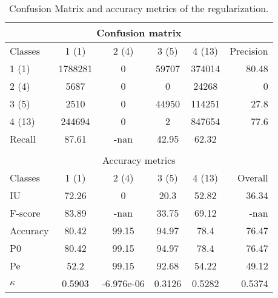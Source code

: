 \begin{table}
\begin{center}
\begin{tabular}{|l|c|c|c|c|r|}
\hline
\multicolumn{6}{|c|}{Confusion matrix} \\
\hline
 Classes & 1 (1) & 2 (4) & 3 (5) & 4 (13) & Precision \\
\hline
1 (1) & 1788281 & 0 & 59707 & 374014 & 80.48 \\
\hline
2 (4) & 5687 & 0 & 0 & 24268 & 0 \\
\hline
3 (5) & 2510 & 0 & 44950 & 114251 & 27.8 \\
\hline
4 (13) & 244694 & 0 & 2 & 847654 & 77.6 \\
\hline
Recall & 87.61 & -nan & 42.95 & 62.32 &  \\
\hline
\multicolumn{6}{c}{ } \\
\hline
\multicolumn{6}{|c|}{Accuracy metrics} \\
\hline
 Classes & 1 (1) & 2 (4) & 3 (5) & 4 (13) & Overall \\
\hline
IU & 72.26 & 0 & 20.3 & 52.82 & 36.34 \\
\hline
F-score & 83.89 & -nan & 33.75 & 69.12 & -nan \\
\hline
Accuracy & 80.42 & 99.15 & 94.97 & 78.4 & 76.47 \\
\hline
P0 & 80.42 & 99.15 & 94.97 & 78.4 & 76.47 \\
\hline
Pe & 52.2 & 99.15 & 92.68 & 54.22 & 49.12 \\
\hline
$\kappa$ & 0.5903 & -6.976e-06 & 0.3126 & 0.5282 & 0.5374 \\
\hline
\end{tabular}
\caption{Confusion Matrix and accuracy metrics of the regularization.}
\end{center}
\end{table}